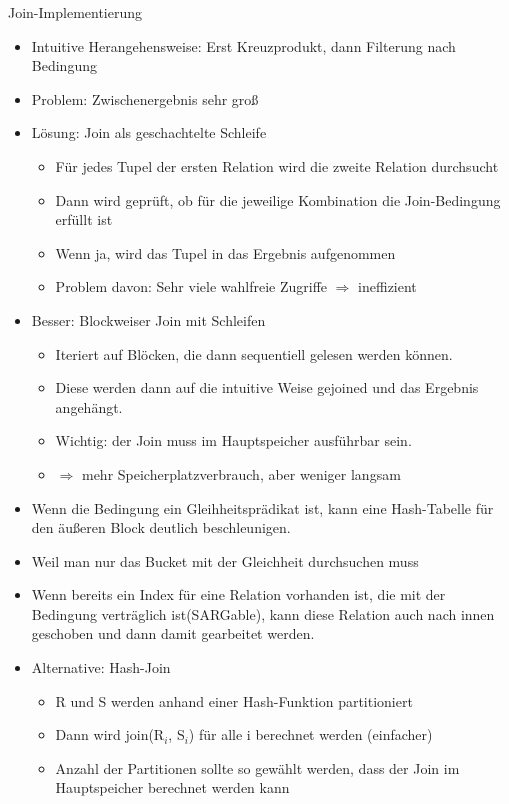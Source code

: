 \documentclass{article}
\begin{document}
\begin{block}{Join-Implementierung}
  \begin{itemize}
    \item Intuitive Herangehensweise: Erst Kreuzprodukt, dann Filterung nach Bedingung
    \item Problem: Zwischenergebnis sehr groß
    \item Lösung: Join als geschachtelte Schleife
    \begin{itemize}
      \item Für jedes Tupel der ersten Relation wird die zweite Relation durchsucht
      \item Dann wird geprüft, ob für die jeweilige Kombination die Join-Bedingung erfüllt ist
      \item Wenn ja, wird das Tupel in das Ergebnis aufgenommen
      \item Problem davon: Sehr viele wahlfreie Zugriffe $\Rightarrow$ ineffizient
    \end{itemize}
    \item Besser: Blockweiser Join mit Schleifen
    \begin{itemize}
      \item Iteriert auf Blöcken, die dann sequentiell gelesen werden können.
      \item Diese werden dann auf die intuitive Weise gejoined und das Ergebnis angehängt.
      \item Wichtig: der Join muss im Hauptspeicher ausführbar sein.
      \item $\Rightarrow$ mehr Speicherplatzverbrauch, aber weniger langsam
    \end{itemize}
    \item Wenn die Bedingung ein Gleihheitsprädikat ist, kann eine Hash-Tabelle für den äußeren Block deutlich beschleunigen.
    \item Weil man nur das Bucket mit der Gleichheit durchsuchen muss
    \item Wenn bereits ein Index für eine Relation vorhanden ist, die mit der Bedingung verträglich ist(SARGable), kann diese Relation auch nach innen geschoben und dann damit gearbeitet werden.
    \item Alternative: Hash-Join
    \begin{itemize}
      \item R und S werden anhand einer Hash-Funktion partitioniert
      \item Dann wird join(R$_i$, S$_i$) für alle i berechnet werden (einfacher)
      \item Anzahl der Partitionen sollte so gewählt werden, dass der Join im Hauptspeicher berechnet werden kann
    \end{itemize}
  \end{itemize}
\end{block}
\end{document}
